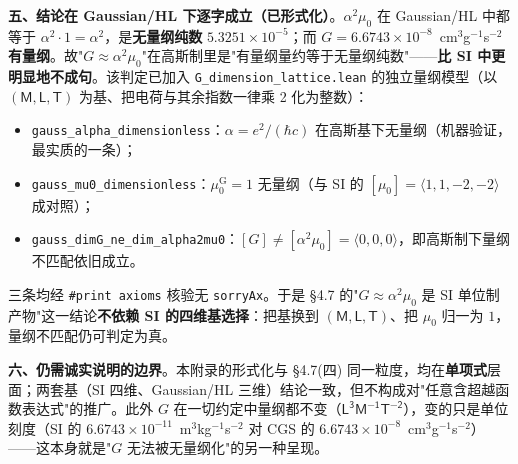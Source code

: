\documentclass[12pt,a4paper]{article}
\begin{document}
\textbf{五、结论在 Gaussian/HL 下逐字成立（已形式化）}。$\alpha^2\mu_0$ 在 Gaussian/HL 中都等于 $\alpha^2\cdot 1 = \alpha^2$，是\textbf{无量纲纯数} $5.3251\times10^{-5}$；而 $G = 6.6743\times10^{-8}$~cm$^3$g$^{-1}$s$^{-2}$ \textbf{有量纲}。故"$G \approx \alpha^2\mu_0$"在高斯制里是"有量纲量约等于无量纲纯数"——\textbf{比 SI 中更明显地不成句}。该判定已加入 \texttt{G\_\allowbreak{}dimension\_\allowbreak{}lattice.lean} 的独立量纲模型（以 $(\mathsf{M},\mathsf{L},\mathsf{T})$ 为基、把电荷与其余指数一律乘 2 化为整数）：
\begin{itemize}
  \item \texttt{gauss\_\allowbreak{}alpha\_\allowbreak{}dimensionless}：$\alpha = e^2/(\hbar c)$ 在高斯基下无量纲（机器验证，最实质的一条）；
  \item \texttt{gauss\_\allowbreak{}mu0\_\allowbreak{}dimensionless}：$\mu_0^{\mathrm{G}} = 1$ 无量纲（与 SI 的 $[\mu_0] = \langle 1,1,-2,-2\rangle$ 成对照）；
  \item \texttt{gauss\_\allowbreak{}dimG\_\allowbreak{}ne\_\allowbreak{}dim\_\allowbreak{}alpha2mu0}：$[G] \neq [\alpha^2\mu_0] = \langle0,0,0\rangle$，即高斯制下量纲不匹配依旧成立。
\end{itemize}
\noindent 三条均经 \texttt{\#print axioms} 核验无 \texttt{sorryAx}。于是 \S4.7 的"$G \approx \alpha^2\mu_0$ 是 SI 单位制产物"这一结论\textbf{不依赖 SI 的四维基选择}：把基换到 $(\mathsf{M},\mathsf{L},\mathsf{T})$、把 $\mu_0$ 归一为 $1$，量纲不匹配仍可判定为真。

\textbf{六、仍需诚实说明的边界}。本附录的形式化与 \S4.7(四) 同一粒度，均在\textbf{单项式}层面；两套基（SI 四维、Gaussian/HL 三维）结论一致，但不构成对"任意含超越函数表达式"的推广。此外 $G$ 在一切约定中量纲都不变（$\mathsf{L^3M^{-1}T^{-2}}$），变的只是单位刻度（SI 的 $6.6743\times10^{-11}$~m$^3$kg$^{-1}$s$^{-2}$ 对 CGS 的 $6.6743\times10^{-8}$~cm$^3$g$^{-1}$s$^{-2}$）——这本身就是"$G$ 无法被无量纲化"的另一种呈现。
\end{document}
